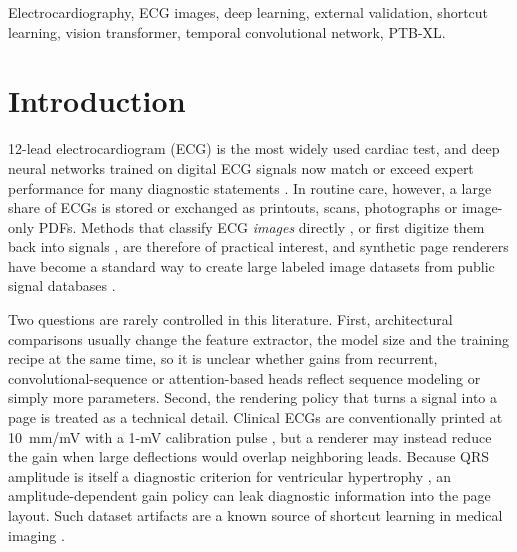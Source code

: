 \documentclass[journal]{IEEEtran}
\begin{document}
\begin{IEEEkeywords}
Electrocardiography, ECG images, deep learning, external validation, shortcut learning, vision transformer, temporal convolutional network, PTB-XL.
\end{IEEEkeywords}

\section{Introduction}
 12-lead electrocardiogram (ECG) is the most widely used cardiac test, and deep neural networks trained on digital ECG signals now match or exceed expert performance for many diagnostic statements \cite{hannun2019cardiologist,ribeiro2020automatic,strodthoff2021benchmark,siontis2021ai}. In routine care, however, a large share of ECGs is stored or exchanged as printouts, scans, photographs or image-only PDFs. Methods that classify ECG \emph{images} directly \cite{sangha2022images}, or first digitize them back into signals \cite{reyna2024challenge,krones2024hough}, are therefore of practical interest, and synthetic page renderers have become a standard way to create large labeled image datasets from public signal databases \cite{shivashankara2024ecgimagekit}.

Two questions are rarely controlled in this literature. First, architectural comparisons usually change the feature extractor, the model size and the training recipe at the same time, so it is unclear whether gains from recurrent, convolutional-sequence or attention-based heads reflect sequence modeling or simply more parameters. Second, the rendering policy that turns a signal into a page is treated as a technical detail. Clinical ECGs are conventionally printed at 10~mm/mV with a 1-mV calibration pulse \cite{hancock2009hypertrophy,shivashankara2024ecgimagekit}, but a renderer may instead reduce the gain when large deflections would overlap neighboring leads. Because QRS amplitude is itself a diagnostic criterion for ventricular hypertrophy \cite{sokolow1949lvh}, an amplitude-dependent gain policy can leak diagnostic information into the page layout. Such dataset artifacts are a known source of shortcut learning in medical imaging \cite{geirhos2020shortcut,degrave2021covid,zech2018pneumonia}.
\end{document}
